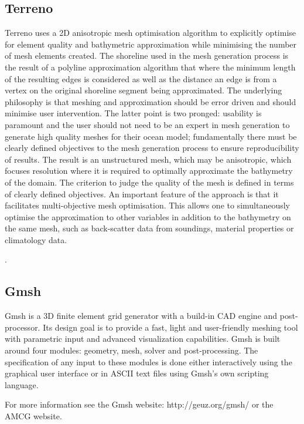 \subsection{Terreno}

Terreno uses a 2D anisotropic mesh optimisation algorithm to explicitly optimise for 
element quality and bathymetric approximation while minimising the number of mesh
elements created. The shoreline used in the mesh generation process is the result 
of a polyline approximation algorithm that where the minimum length of the resulting 
edges is considered as well as the distance an edge is from a vertex on the original 
shoreline segment being approximated. The underlying philosophy is that meshing and 
approximation should be error driven and should minimise user intervention. The 
latter point is two pronged: usability is paramount and the user should not need 
to be an expert in mesh generation to generate high quality meshes for their ocean 
model; fundamentally there must be clearly defined objectives to the mesh generation 
process to ensure reproducibility of results. The result is an unstructured mesh, 
which may be anisotropic, which focuses resolution where it is required to optimally 
approximate the bathymetry of the domain. The criterion to judge the quality of the 
mesh is defined in terms of clearly defined objectives. An important feature of the 
approach is that it facilitates multi-objective mesh optimisation. This allows one to 
simultaneously optimise the approximation to other variables in addition to the 
bathymetry on the same mesh, such as back-scatter data from soundings, material 
properties or climatology data. 

\website.

\subsection{Gmsh}

Gmsh is a 3D finite element grid generator with a build-in CAD engine and post-processor.
Its design goal is to provide a fast, light and user-friendly meshing tool with parametric
input and advanced visualization capabilities. Gmsh is built around four modules: geometry, 
mesh, solver and post-processing. The specification of any input to these modules is done
either interactively using the graphical user interface or in ASCII text files using Gmsh's
own scripting language. 

For more information see the Gmsh website: http://geuz.org/gmsh/ or the AMCG website.


